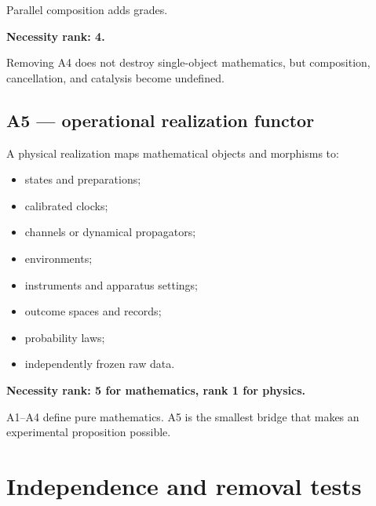 \documentclass[11pt,a4paper,openany]{report}
\begin{document}
Parallel composition adds grades.

\textbf{Necessity rank: 4.}

Removing A4 does not destroy single-object mathematics, but composition, cancellation, and catalysis become undefined.

\subsection{A5 --- operational realization functor}

A physical realization maps mathematical objects and morphisms to:

\begin{itemize}
\item 
states and preparations;

\item 
calibrated clocks;

\item 
channels or dynamical propagators;

\item 
environments;

\item 
instruments and apparatus settings;

\item 
outcome spaces and records;

\item 
probability laws;

\item 
independently frozen raw data.

\end{itemize}

\textbf{Necessity rank: 5 for mathematics, rank 1 for physics.}

A1--A4 define pure mathematics. A5 is the smallest bridge that makes an experimental proposition possible.

\section{Independence and removal tests}
\end{document}
